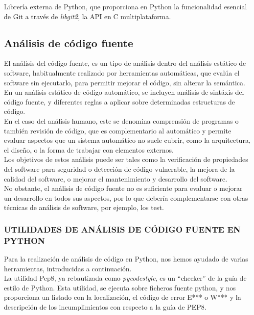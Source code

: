 Librería externa de Python, que proporciona en Python la funcionalidad esencial de Git a través de \textit{libgit2}, la API en C multiplataforma.

\subsection{Análisis de código fuente} 
\label{sec:anal_cod}

El análisis del código fuente, es un tipo de análisis dentro del análisis estático de software, habitualmente realizado por herramientas automáticas, que evalúa el software sin ejecutarlo, para permitir mejorar el código, sin alterar la semántica.\\


En un análisis estático de código automático, se incluyen análisis de sintáxis del código fuente, y diferentes reglas a aplicar sobre determinadas estructuras de código.\\


En el caso del análisis humano, este se denomina comprensión de programas o también revisión de código, que es complementario al automático y permite evaluar aspectos que un sistema automático no suele cubrir, como la arquitectura, el diseño, o la forma de trabajar con elementos externos.\\


Los objetivos de estos análisis puede ser tales como la verificación de propiedades del software para seguridad o detección de código vulnerable, la mejora de la calidad del software, o mejorar el mantenimiento y desarrollo del software.\\


No obstante, el análisis de código fuente no es suficiente para evaluar o mejorar un desarrollo en todos sus aspectos, por lo que debería complementarse con otras técnicas de análisis de software, por ejemplo, los test.\\


\subsubsection{UTILIDADES DE ANÁLISIS DE CÓDIGO FUENTE EN PYTHON} 
\label{sec:utilidades_cod}


Para la realización de análisis de código en Python, nos hemos ayudado de varias herramientas, introducidas a continuación.\\


La utilidad Pep8, ya rebautizada como \textit{pycodestyle}, es un ``checker'' de la guía de estilo de Python. Esta utilidad, se ejecuta sobre ficheros fuente python, y nos proporciona un listado con la localización, el código de error E*** o W*** y la descripción de los incumplimientos con respecto a la guía de PEP8.\\


